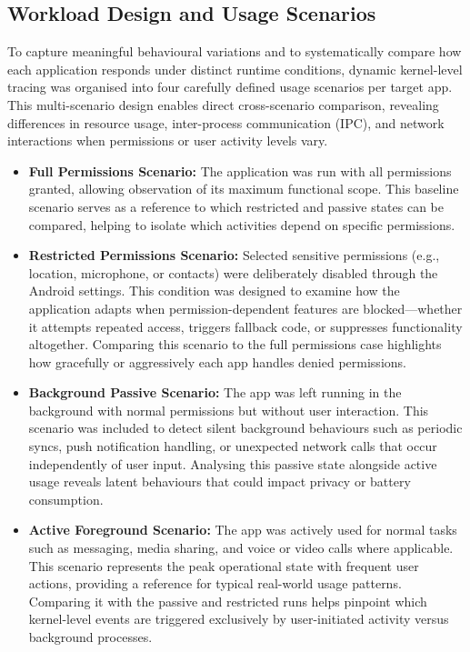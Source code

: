 \documentclass[a4paper,12pt]{report}
\begin{document}
\subsection{Workload Design and Usage Scenarios}

To capture meaningful behavioural variations and to systematically compare how each application responds under distinct runtime conditions, dynamic kernel-level tracing was organised into four carefully defined usage scenarios per target app. This multi-scenario design enables direct cross-scenario comparison, revealing differences in resource usage, inter-process communication (IPC), and network interactions when permissions or user activity levels vary.

\begin{itemize}
  \item \textbf{Full Permissions Scenario:} The application was run with all permissions granted, allowing observation of its maximum functional scope. This baseline scenario serves as a reference to which restricted and passive states can be compared, helping to isolate which activities depend on specific permissions.

  \item \textbf{Restricted Permissions Scenario:} Selected sensitive permissions (e.g., location, microphone, or contacts) were deliberately disabled through the Android settings. This condition was designed to examine how the application adapts when permission-dependent features are blocked—whether it attempts repeated access, triggers fallback code, or suppresses functionality altogether. Comparing this scenario to the full permissions case highlights how gracefully or aggressively each app handles denied permissions.

  \item \textbf{Background Passive Scenario:} The app was left running in the background with normal permissions but without user interaction. This scenario was included to detect silent background behaviours such as periodic syncs, push notification handling, or unexpected network calls that occur independently of user input. Analysing this passive state alongside active usage reveals latent behaviours that could impact privacy or battery consumption.

  \item \textbf{Active Foreground Scenario:} The app was actively used for normal tasks such as messaging, media sharing, and voice or video calls where applicable. This scenario represents the peak operational state with frequent user actions, providing a reference for typical real-world usage patterns. Comparing it with the passive and restricted runs helps pinpoint which kernel-level events are triggered exclusively by user-initiated activity versus background processes.
\end{itemize}
\end{document}
